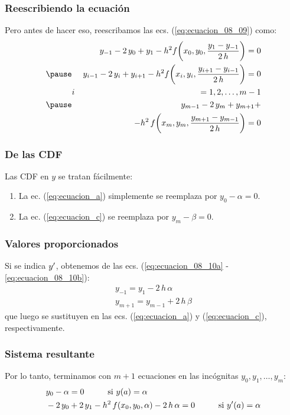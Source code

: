 \documentclass[12pt]{beamer}
\begin{document}
\begin{frame}
\frametitle{Reescribiendo la ecuación}
Pero antes de hacer eso, reescribamos las ecs. (\ref{eq:ecuacion_08_09}) como:
\pause
\begin{eqnarray}
&{}& y_{-1} - 2 \, y_{0} + y_{1} - h^{2}  f \bigg( x_{0}, y_{0}, \dfrac{y_{1} - y_{-1}}{2 \, h} \bigg) = 0 \label{eq:ecuacion_a} \\ \pause
&{}&y_{i-1} - 2 \, y_{i} + y_{i+1} - h^{2}  f \bigg( x_{i}, y_{i}, \dfrac{y_{i+1} - y_{i-1}}{2 \, h} \bigg) = 0 \label{eq:ecuacion_b}\\
&i& = 1, 2, \ldots, m-1 \nonumber \\ \pause
&{}& y_{m-1} - 2 \, y_{m} + y_{m+1} + \nonumber \\
&{}& - h^{2} \, f \bigg( x_{m}, y_{m}, \dfrac{y_{m+1} - y_{m-1}}{2 \, h} \bigg) = 0 \label{eq:ecuacion_c}
\end{eqnarray}
\end{frame}
\begin{frame}
\frametitle{De las CDF}
Las CDF en $y$ se tratan fácilmente:
\pause
{}
\begin{enumerate}[<+->]
\item La ec. (\ref{eq:ecuacion_a}) simplemente se reemplaza por $y_{0} - \alpha = 0$.
\item La ec. (\ref{eq:ecuacion_c}) se reemplaza por $y_{m} - \beta = 0$.
\end{enumerate}
\end{frame}
\begin{frame}
\frametitle{Valores proporcionados}
Si se indica ${y}^{\prime}$, obtenemos de las ecs. (\ref{eq:ecuacion_08_10a} - \ref{eq:ecuacion_08_10b}):
\pause
\begin{align*}
y_{-1} = y_{1} - 2 \, h \, \alpha \\
y_{m+1} = y_{m-1} + 2 \, h \, \beta
\end{align*}
\pause
que luego se sustituyen en las ecs. (\ref{eq:ecuacion_a}) y (\ref{eq:ecuacion_c}), respectivamente.
\end{frame}
\begin{frame}
\frametitle{Sistema resultante}
Por lo tanto, terminamos con $m + 1$ ecuaciones en las incógnitas $y_{0}, y_{1}, \ldots, y_{m}$:
\pause
\begin{eqnarray}
\begin{aligned}
&y_{0} - \alpha = 0 \hspace{1cm} \text{si } y (a) = \alpha \\
&-2 \, y_{0} + 2 \, y_{1} - h^{2} \, f (x_{0}, y_{0}, \alpha) - 2\, h \, \alpha = 0 \hspace{1cm} \text{si } {y}^{\prime} (a) = \alpha \\
\end{aligned}
\label{eq:ecuacion_08_11_a}
\end{eqnarray}
\end{frame}
\end{document}
